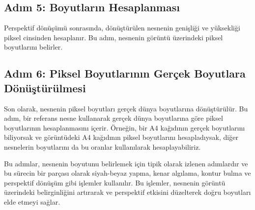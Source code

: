 \documentclass[11pt,a4paper]{report}
\begin{document}
	\subsection{Adım 5: Boyutların Hesaplanması}
	Perspektif dönüşümü sonrasında, dönüştürülen nesnenin genişliği ve yüksekliği piksel cinsinden hesaplanır. Bu adım, nesnenin görüntü üzerindeki piksel boyutlarını belirler.
	
	\subsection{Adım 6: Piksel Boyutlarının Gerçek Boyutlara Dönüştürülmesi}
	Son olarak, nesnenin piksel boyutları gerçek dünya boyutlarına dönüştürülür. Bu adım, bir referans nesne kullanarak gerçek dünya boyutlarına göre piksel boyutlarının hesaplanmasını içerir. Örneğin, bir A4 kağıdının gerçek boyutlarını biliyorsak ve görüntüdeki A4 kağıdının piksel boyutlarını hesapladıysak, diğer nesnelerin boyutlarını da bu oranlar kullanılarak hesaplayabiliriz.
	
	
	Bu adımlar, nesnenin boyutunu belirlemek için tipik olarak izlenen adımlardır ve bu sürecin bir parçası olarak siyah-beyaz yapma, kenar algılama, kontur bulma ve perspektif dönüşüm gibi işlemler kullanılır. Bu işlemler, nesnenin görüntü üzerindeki belirginliğini artırarak ve perspektif etkisini düzelterek doğru boyutları elde etmeyi sağlar.\cite{Nesne-Boyutunu-Bulma-Adımları}
	\clearpage
	
\end{document}
